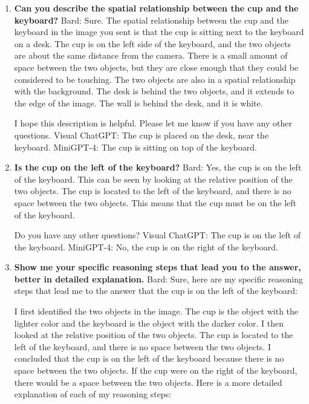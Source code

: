     \begin{enumerate}
        \item \textbf{Can you describe the spatial relationship between the cup and the keyboard?}
        \subitem Bard: 
        Sure. The spatial relationship between the cup and the keyboard in the image you sent is that the cup is sitting next to the keyboard on a desk. The cup is on the left side of the keyboard, and the two objects are about the same distance from the camera. There is a small amount of space between the two objects, but they are close enough that they could be considered to be touching.
        The two objects are also in a spatial relationship with the background. The desk is behind the two objects, and it extends to the edge of the image. The wall is behind the desk, and it is white.

        I hope this description is helpful. Please let me know if you have any other questions.
        \subitem Visual ChatGPT: The cup is placed on the desk, near the keyboard.
        \subitem MiniGPT-4: The cup is sitting on top of the keyboard.
        \item \textbf{Is the cup on the left of the keyboard?}
        \subitem Bard: 
        Yes, the cup is on the left of the keyboard. This can be seen by looking at the relative position of the two objects. The cup is located to the left of the keyboard, and there is no space between the two objects. This means that the cup must be on the left of the keyboard.
        
        Do you have any other questions?
        \subitem Visual ChatGPT: The cup is on the left of the keyboard.
        \subitem MiniGPT-4: No, the cup is on the right of the keyboard.
        \item \textbf{Show me your specific reasoning steps that lead you to the answer, better in detailed explanation.}
        \subitem Bard:
        Sure, here are my specific reasoning steps that lead me to the answer that the cup is on the left of the keyboard:
        
        I first identified the two objects in the image. The cup is the object with the lighter color and the keyboard is the object with the darker color.
        I then looked at the relative position of the two objects. The cup is located to the left of the keyboard, and there is no space between the two objects.
        I concluded that the cup is on the left of the keyboard because there is no space between the two objects. If the cup were on the right of the keyboard, there would be a space between the two objects.
        Here is a more detailed explanation of each of my reasoning steps:
        

\end{enumerate}
